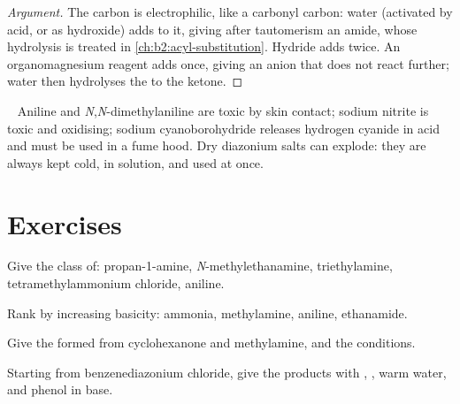 \begin{proof}[Argument]
The  carbon is electrophilic, like a carbonyl carbon: water (activated by acid, or as
hydroxide) adds to it, giving after tautomerism an amide, whose hydrolysis is treated in
\cref{ch:b2:acyl-substitution}. Hydride adds twice. An organomagnesium reagent adds once,
giving an  anion that does not react further; water then hydrolyses the  to the ketone.
\end{proof}

\begin{safety}{\,\,\,}
Aniline and \textit{N},\textit{N}-dimethylaniline are toxic by skin contact; sodium nitrite is
toxic and oxidising; sodium cyanoborohydride releases hydrogen cyanide in acid and must be used
in a fume hood. Dry diazonium salts can explode: they are always kept cold, in solution, and used
at once.
\end{safety}

\section{Exercises}

\begin{exercise}[$\star$]\label{exo:b2:amines:1}
Give the class of: propan-1-amine, \textit{N}-methylethanamine, triethylamine,
tetramethylammonium chloride, aniline.
\end{exercise}

\begin{exercise}[$\star$]\label{exo:b2:amines:2}
Rank by increasing basicity: ammonia, methylamine, aniline, ethanamide.
\end{exercise}

\begin{exercise}[$\star$]\label{exo:b2:amines:3}
Give the  formed from cyclohexanone and methylamine, and the conditions.
\end{exercise}

\begin{exercise}[$\star$]\label{exo:b2:amines:4}
Starting from benzenediazonium chloride, give the products with , , warm water,
and phenol in base.
\end{exercise}

